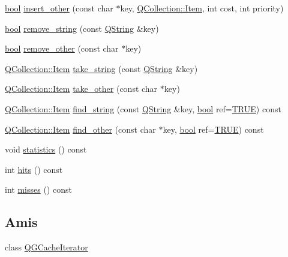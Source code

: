 \begin{DoxyCompactItemize}
\item 
\hyperlink{qglobal_8h_a1062901a7428fdd9c7f180f5e01ea056}{bool} \hyperlink{class_q_g_cache_a2746f839f86692c8b9039cab3128337e}{insert\+\_\+other} (const char $\ast$key, \hyperlink{class_q_collection_ac6f3ddbf999e31fb797927f71ae6b5d7}{Q\+Collection\+::\+Item}, int cost, int priority)
\item 
\hyperlink{qglobal_8h_a1062901a7428fdd9c7f180f5e01ea056}{bool} \hyperlink{class_q_g_cache_aff2d410561a6e4b92bdb5d74b48212ad}{remove\+\_\+string} (const \hyperlink{class_q_string}{Q\+String} \&key)
\item 
\hyperlink{qglobal_8h_a1062901a7428fdd9c7f180f5e01ea056}{bool} \hyperlink{class_q_g_cache_a56c49e66aeb6b25295200730a0e700d8}{remove\+\_\+other} (const char $\ast$key)
\item 
\hyperlink{class_q_collection_ac6f3ddbf999e31fb797927f71ae6b5d7}{Q\+Collection\+::\+Item} \hyperlink{class_q_g_cache_a4b15c35953469e7fbcddb09745d97b9f}{take\+\_\+string} (const \hyperlink{class_q_string}{Q\+String} \&key)
\item 
\hyperlink{class_q_collection_ac6f3ddbf999e31fb797927f71ae6b5d7}{Q\+Collection\+::\+Item} \hyperlink{class_q_g_cache_aadb5340c0a6678cfa0d8352757b0be93}{take\+\_\+other} (const char $\ast$key)
\item 
\hyperlink{class_q_collection_ac6f3ddbf999e31fb797927f71ae6b5d7}{Q\+Collection\+::\+Item} \hyperlink{class_q_g_cache_aff8f50207cc01d9ad02440cf5d60cfc8}{find\+\_\+string} (const \hyperlink{class_q_string}{Q\+String} \&key, \hyperlink{qglobal_8h_a1062901a7428fdd9c7f180f5e01ea056}{bool} ref=\hyperlink{qglobal_8h_a04a6422a52070f0dc478693da640242b}{T\+R\+U\+E}) const 
\item 
\hyperlink{class_q_collection_ac6f3ddbf999e31fb797927f71ae6b5d7}{Q\+Collection\+::\+Item} \hyperlink{class_q_g_cache_ab9689a87908168bf1638623ae1ab164b}{find\+\_\+other} (const char $\ast$key, \hyperlink{qglobal_8h_a1062901a7428fdd9c7f180f5e01ea056}{bool} ref=\hyperlink{qglobal_8h_a04a6422a52070f0dc478693da640242b}{T\+R\+U\+E}) const 
\item 
void \hyperlink{class_q_g_cache_a8224a93e5ae7983695921145ee271399}{statistics} () const 
\item 
int \hyperlink{class_q_g_cache_a361c9c79abdd8a13cc236df74b1a36c6}{hits} () const 
\item 
int \hyperlink{class_q_g_cache_a6206e03872f5f17903234c0225ef1515}{misses} () const 
\end{DoxyCompactItemize}
\subsection*{Amis}
\begin{DoxyCompactItemize}
\item 
class \hyperlink{class_q_g_cache_a37933afdeb94bef86bf66aca84fc229c}{Q\+G\+Cache\+Iterator}
\end{DoxyCompactItemize}
